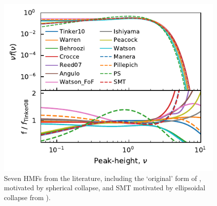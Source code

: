 \documentclass[5p,aas_macros]{elsarticle}
\newcommand{\bd}[1]{\textcolor{purple}{\textbf{[BD: #1]}}}
\begin{document}
\begin{figure}
  \centering
  \includegraphics[width=\linewidth]{figures/hmf_models.pdf}
  \caption[Several HMF fits]{Seven HMFs from the literature, including the `original' form of \protect\citet[][`PS']{Press1974}, motivated by spherical collapse, and \textsc{SMT} motivated by ellipsoidal collapse from \protect\citet{Sheth2001}).}
  \label{fig:mfs}
\end{figure}




\end{document}
